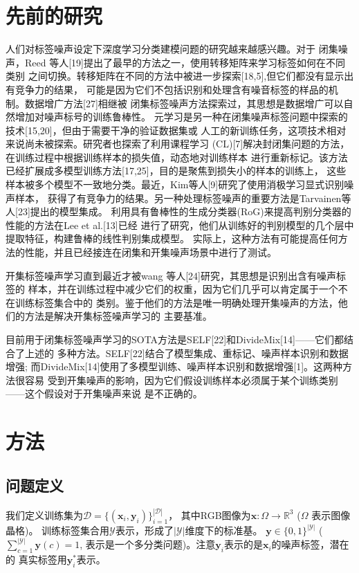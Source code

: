 \documentclass[12pt]{article}
\begin{document}
\section{先前的研究}
人们对标签噪声设定下深度学习分类建模问题的研究越来越感兴趣。对于
闭集噪声，Reed 等人[19]提出了最早的方法之一，使用转移矩阵来学习标签如何在不同类别
之间切换。转移矩阵在不同的方法中被进一步探索[18,5],但它们都没有显示出有竞争力的结果，
可能是因为它们不包括识别和处理含有噪音标签的样品的机制。数据增广方法[27]相继被
闭集标签噪声方法探索过，其思想是数据增广可以自然增加对噪声标号的训练鲁棒性。
元学习是另一种在闭集噪声标签问题中探索的技术[15,20]，但由于需要干净的验证数据集或
人工的新训练任务，这项技术相对来说尚未被探索。研究者也探索了利用课程学习
(CL)[7]解决封闭集问题的方法，在训练过程中根据训练样本的损失值，动态地对训练样本
进行重新标记。该方法已经扩展成多模型训练方法[17,25]，目的是聚焦到损失小的样本的训练上，
这些样本被多个模型不一致地分类。最近，Kim等人[9]研究了使用消极学习显式识别噪声样本，
获得了有竞争力的结果。另一种处理标签噪声的重要方法是Tarvainen等人[23]提出的模型集成。
利用具有鲁棒性的生成分类器(RoG)来提高判别分类器的性能的方法在Lee et al.[13]已经
进行了研究，他们从训练好的判别模型的几个层中提取特征，构建鲁棒的线性判别集成模型。
实际上，这种方法有可能提高任何方法的性能，并且已经接连在闭集和开集噪声场景中进行了测试。

开集标签噪声学习直到最近才被wang 等人[24]研究，其思想是识别出含有噪声标签的
样本，并在训练过程中减少它们的权重，因为它们几乎可以肯定属于一个不在训练标签集合中的
类别。鉴于他们的方法是唯一明确处理开集噪声的方法，他们的方法是解决开集标签噪声学习的
主要基准。

目前用于闭集标签噪声学习的SOTA方法是SELF[22]和DivideMix[14]——它们都结合了上述的
多种方法。SELF[22]结合了模型集成、重标记、噪声样本识别和数据增强;
而DivideMix[14]使用了多模型训练、噪声样本识别和数据增强[1]。这两种方法很容易
受到开集噪声的影响，因为它们假设训练样本必须属于某个训练类别——这个假设对于开集噪声来说
是不正确的。
\section{方法}
\subsection{问题定义}
我们定义训练集为$\mathcal{D}=\{(\mathbf{x}_i,\mathbf{y}_i)\}_{i=1}^{|\mathcal{D}|}$，
其中RGB图像为$\mathbf{x}:\Omega \rightarrow \mathbb{R}^3$ ($\Omega$ 表示图像晶格)。
训练标签集合用$\mathcal{Y}$表示，形成了$|\mathcal{Y}|$维度下的标准基。
$\mathbf{y} \in \{0,1\}^{|\mathcal{Y}|}$ ($\sum_{c=1}^{|\mathcal{Y}|}\mathbf{y}(c)=1$,
表示是一个多分类问题)。注意$\mathbf{y}_i$表示的是$\mathbf{x}_i$的噪声标签，潜在的
真实标签用$\mathbf{y}^{*}_i$表示。
\end{document}
